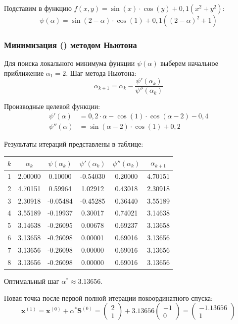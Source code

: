\documentclass[a4paper,12pt]{article}
\begin{document}
Подставим в функцию $f(x, y) =  \sin(x)\cdot\cos(y)+0,1(x^2+y^2)$:
\[
\psi(\alpha) = \sin(2-\alpha)\cdot\cos(1)+0,1((2-\alpha)^2+1)
\]
\subsubsection*{Минимизация \psi(\alpha) методом Ньютона}

Для поиска локального минимума функции $\psi(\alpha)$ выберем начальное приближение $\alpha_1 = 2$. Шаг метода Ньютона:
\[
\alpha_{k+1} = \alpha_k - \frac{\psi'(\alpha_k)}{\psi''(\alpha_k)}
\]

Производные целевой функции:
\begin{align*}
    \psi'(\alpha) &= 0,2\cdot \alpha - \cos{(1)}\cdot\cos{(\alpha - 2)} - 0,4 \\
    \psi''(\alpha) &= \sin(\alpha - 2)\cdot\cos(1) + 0,2 
\end{align*}

Результаты итераций представлены в таблице:

\begin{center}
\begin{tabular}{|c|c|c|c|c|c|}
\hline
$k$ & $\alpha_k$ & $\psi(\alpha_k)$ & $\psi'(\alpha_k)$ & $\psi''(\alpha_k)$ & $\alpha_{k+1}$ \\ \hline
1 & 2.00000 & 0.10000 & -0.54030 & 0.20000 & 4.70151 \\ \hline
2 & 4.70151 & 0.59964 & 1.02912 & 0.43018 & 2.30918 \\ \hline
3 & 2.30918 & -0.05484 & -0.45285 & 0.36440 & 3.55189 \\ \hline
4 & 3.55189 & -0.19937 & 0.30017 & 0.74021 & 3.14638 \\ \hline
5 & 3.14638 & -0.26095 & 0.00678 & 0.69237 & 3.13658 \\ \hline
6 & 3.13658 & -0.26098 & 0.00001 & 0.69016 & 3.13656 \\ \hline
7 & 3.13656 & -0.26098 & 0.00000 & 0.69016 & 3.13656 \\ \hline
8 & 3.13656 & -0.26098 & 0.00000 & 0.69016 & 3.13656 \\ \hline
\end{tabular}
\end{center}

Оптимальный шаг $\alpha^* \approx 3.13656$.

Новая точка после первой полной итерации покоординатного спуска:
\[
\mathbf{x}^{(1)} = \mathbf{x}^{(0)} + \alpha^* \mathbf{S}^{(0)} = \begin{pmatrix} 2 \\ 1 \end{pmatrix} + 3.13656 \begin{pmatrix} -1 \\ 0 \end{pmatrix} = \begin{pmatrix} -1.13656 \\ 1 \end{pmatrix}
\]
\end{document}
